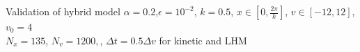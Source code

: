 \documentclass{beamer}
\begin{document}
\begin{frame}{Validation of hybrid model}
  $\alpha = 0.2$,$\epsilon=10^{-2}$, $k=0.5$, $x\in[0,\frac{2\pi}{k}]$, $v\in[-12,12]$, $v_0 = 4$ \\
  $N_x = 135$, $N_v = 1200, $, $\Delta t = 0.5\Delta v$ for kinetic and LHM
\end{frame}
\end{document}
